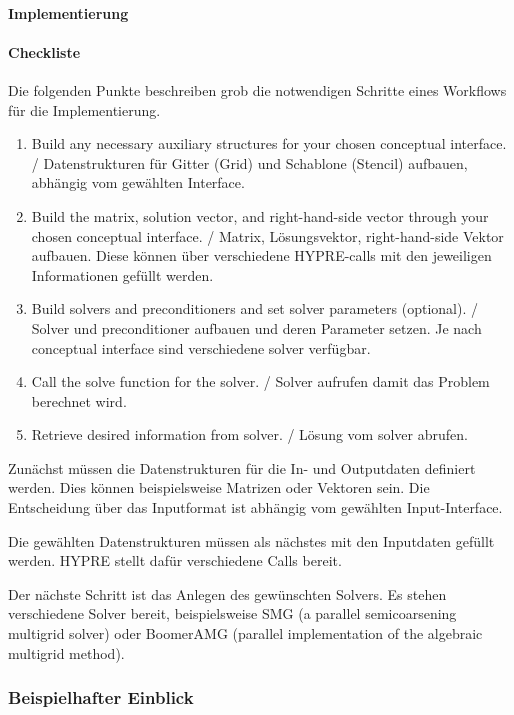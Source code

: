 \documentclass[a4paper,10pt]{article}
\begin{document}
\paragraph{Implementierung}

\paragraph{Checkliste}

Die folgenden Punkte beschreiben grob die notwendigen Schritte eines Workflows für die Implementierung.

\begin{enumerate}
 \item Build any necessary auxiliary structures for your chosen conceptual interface. /
 Datenstrukturen für Gitter (Grid) und Schablone (Stencil) aufbauen, abhängig vom gewählten Interface.
 \item Build the matrix, solution vector, and right-hand-side vector through your chosen conceptual interface. /
 Matrix, Lösungsvektor, right-hand-side Vektor aufbauen. 
 Diese können über verschiedene HYPRE-calls mit den jeweiligen Informationen gefüllt werden.
 \item Build solvers and preconditioners and set solver parameters (optional). /
 Solver und preconditioner aufbauen und deren Parameter setzen.
 Je nach conceptual interface sind verschiedene solver verfügbar.
 \item Call the solve function for the solver. /
 Solver aufrufen damit das Problem berechnet wird.
 \item Retrieve desired information from solver. /
 Lösung vom solver abrufen.
\end{enumerate}

Zunächst müssen die Datenstrukturen für die In- und Outputdaten definiert werden.
Dies können beispielsweise Matrizen oder Vektoren sein.
Die Entscheidung über das Inputformat ist abhängig vom gewählten Input-Interface.

Die gewählten Datenstrukturen müssen als nächstes mit den Inputdaten gefüllt werden.
HYPRE stellt dafür verschiedene Calls bereit.

Der nächste Schritt ist das Anlegen des gewünschten Solvers.
Es stehen verschiedene Solver bereit\cite{hypreManual}, beispielsweise SMG (a parallel semicoarsening multigrid solver) oder BoomerAMG (parallel implementation of the algebraic multigrid method).

\subsubsection{Beispielhafter Einblick}
\end{document}
